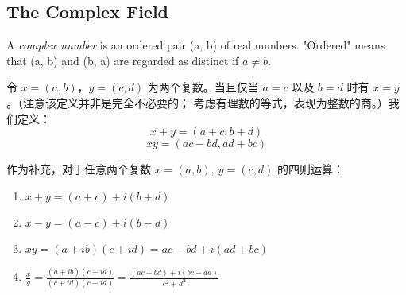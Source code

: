 \documentclass[../poma-note.tex]{subfiles}
\begin{document}
\subsection*{The Complex Field}

\begin{definition}
	A \textit{complex number} is an ordered pair (a, b) of real numbers. "Ordered" means that (a, b) and (b, a)
	are regarded as distinct if $a \neq b$.
\end{definition}

令 $x=(a,b)$，$y=(c,d)$ 为两个复数。当且仅当 $a=c$ 以及 $b=d$ 时有 $x=y$。（注意该定义并非是完全不必要的；
考虑有理数的等式，表现为整数的商。）我们定义：
\[x+y=(a+c,b+d)\]
\[xy=(ac-bd,ad+bc)\]

\anote
作为补充，对于任意两个复数 $x=(a,b),\ y=(c,d)$ 的四则运算：
\begin{enumerate}[label=(\arabic*)]
	\item $x+y=(a+c)+i(b+d)$
	\item $x-y=(a-c)+i(b-d)$
	\item $xy=(a+ib)(c+id)=ac-bd+i(ad+bc)$
	\item $\frac{x}{y} = \frac{(a+ib)(c-id)}{(c+id)(c-id)} = \frac{(ac+bd)+i(bc-ad)}{c^2+d^2}$
\end{enumerate}
\end{document}
